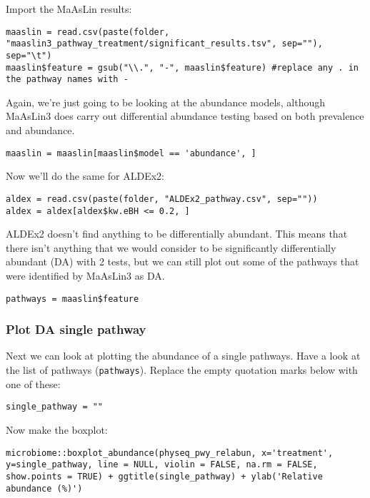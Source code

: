 \documentclass[
]{book}
\begin{document}
Import the MaAsLin results:

\begin{verbatim}
maaslin = read.csv(paste(folder, "maaslin3_pathway_treatment/significant_results.tsv", sep=""), sep="\t")
maaslin$feature = gsub("\\.", "-", maaslin$feature) #replace any . in the pathway names with -
\end{verbatim}

Again, we're just going to be looking at the abundance models, although MaAsLin3 does carry out differential abundance testing based on both prevalence and abundance.

\begin{verbatim}
maaslin = maaslin[maaslin$model == 'abundance', ]
\end{verbatim}

Now we'll do the same for ALDEx2:

\begin{verbatim}
aldex = read.csv(paste(folder, "ALDEx2_pathway.csv", sep=""))
aldex = aldex[aldex$kw.eBH <= 0.2, ]
\end{verbatim}

ALDEx2 doesn't find anything to be differentially abundant. This means that there isn't anything that we would consider to be significantly differentially abundant (DA) with 2 tests, but we can still plot out some of the pathways that were identified by MaAsLin3 as DA.

\begin{verbatim}
pathways = maaslin$feature
\end{verbatim}

\subsubsection{Plot DA single pathway}\label{plot-da-single-pathway}

Next we can look at plotting the abundance of a single pathways. Have a look at the list of pathways (\texttt{pathways}). Replace the empty quotation marks below with one of these:

\begin{verbatim}
single_pathway = ""
\end{verbatim}

Now make the boxplot:

\begin{verbatim}
microbiome::boxplot_abundance(physeq_pwy_relabun, x='treatment', y=single_pathway, line = NULL, violin = FALSE, na.rm = FALSE, show.points = TRUE) + ggtitle(single_pathway) + ylab('Relative abundance (%)')
\end{verbatim}
\end{document}
